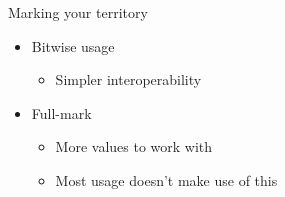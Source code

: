 \documentclass[black,white,aspectratio=169]{beamer}
\DeclareRobustCommand{\#}{\adjustbox{valign=B,totalheight=.57\baselineskip}{\oldhash}}%
\newcommand\todo[1]{
    \textcolor{red}{#1}
}
\begin{document}
    \begin{frame}{Marking your territory}
        \begin{itemize}
            \item Bitwise usage~\smallskip
            \begin{itemize}
                \item Simpler interoperability~\smallskip
            \end{itemize}
            \item Full-mark~\smallskip
            \begin{itemize}
                \item More values to work with~\smallskip
                \item Most usage doesn't make use of this~\medskip
            \end{itemize}

        \end{itemize}
    \end{frame}

\end{document}
